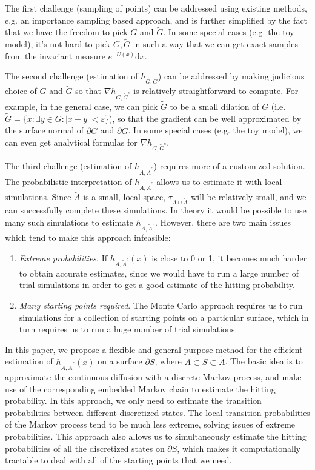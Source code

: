\documentclass[english, aip, jcp, priprint, graphicx,floatfix]{revtex4-1}
\theoremstyle{plain}
\theoremstyle{definition}
\theoremstyle{plain}
\begin{document}
The first challenge (sampling of points) can be addressed using existing methods, e.g. an importance sampling based approach, and is further simplified by the fact that we have the freedom to pick $G$ and $\tilde{G}$. In some special cases (e.g. the toy model), it's not hard to pick $G, \tilde{G}$ in such a way that we can get exact samples from the invariant measure $e^{- U (x)} \mathrm{d} x$.

The second challenge (estimation of $h_{G,\tilde G}$) can be addressed by making judicious choice of $G$ and
$\tilde{G}$ so that $\nabla h_{G, \tilde{G}^c}$ is relatively straightforward
to compute. For example, in the general case, we can pick $\tilde{G}$ to be a
small dilation of $G$ (i.e. $\tilde{G} = \{ x : \exists y \in G : | x - y | <
\varepsilon \}$), so that the gradient can be well approximated by the surface
normal of $\partial G$ and $\partial \tilde{G}$. In some special cases (e.g.
the toy model), we can even get analytical formulas for $\nabla h_{G,
\tilde{G}^c}$.

The third challenge (estimation of $h_{A,\tilde A^c}$) requires more of a customized solution. The probabilistic interpretation of $h_{A, \tilde{A}^c}$ allows us to estimate it with local simulations. Since $\tilde{A}$ is a small, local space, $\tau_{A \cup \tilde{A}}$ will be relatively small, and we can successfully complete these simulations. In theory it would be possible to use many such simulations to estimate $h_{A,\tilde{A}^c}$. However, there are two main issues which tend to make this approach infeasible:
\begin{enumerate}
\item \emph{Extreme probabilities}.  If $h_{A, \tilde{A}^c} (x)$ is close to 0 or 1, it becomes much harder
to obtain accurate estimates, since we would have to run a large number of
trial simulations in order to get a good estimate of the hitting
probability.

\item \emph{Many starting points required}.  The Monte Carlo approach requires us to run simulations for a collection of starting points on a particular surface, which in turn requires us to run a huge number of trial simulations. 
\end{enumerate}
In this paper, we propose a flexible and general-purpose method for the
efficient estimation of $h_{A, \tilde{A}^c} (x)$ on a surface $\partial S$, where $A \subset S \subset \tilde{A}$. The basic idea is to approximate the continuous diffusion with a discrete Markov process, and make use of the corresponding embedded Markov chain to estimate the hitting probability. In this approach, we only need to estimate the transition probabilities between different discretized states. The local transition probabilities of the Markov process tend to be much less extreme, solving issues of extreme probabilities.  This approach also allows us to simultaneously estimate the hitting probabilities of all the discretized states on $\partial S$, which makes it computationally tractable to deal with all of the starting points that we need.
\end{document}
